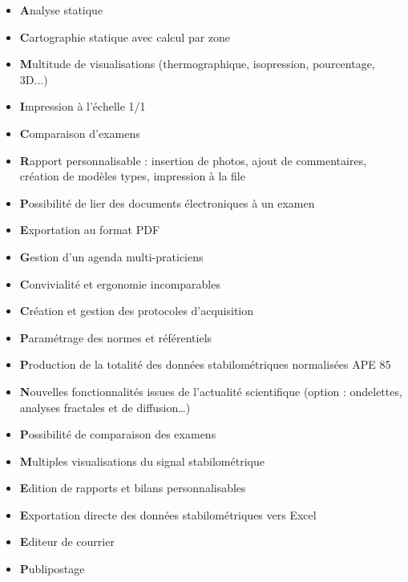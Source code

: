 \begin{itemize}

    \item \textbf Analyse statique 
    \item \textbf Cartographie statique avec calcul par zone 
    \item \textbf Multitude de visualisations (thermographique, isopression, pourcentage, 3D...)  
    \item \textbf Impression à l’échelle 1/1 
    \item \textbf Comparaison d’examens
    \item \textbf Rapport personnalisable : insertion de photos, ajout de commentaires, création de modèles types, impression à la file 
     \item \textbf Possibilité de lier des documents électroniques à un examen 
     \item \textbf Exportation au format PDF 
    \item \textbf Gestion d’un agenda multi-praticiens
    \item \textbf Convivialité et ergonomie incomparables 
    \item \textbf Création et gestion des protocoles d’acquisition 
    \item \textbf Paramétrage des normes et référentiels 
    \item \textbf Production de la totalité des données stabilométriques normalisées APE 85 
    \item \textbf Nouvelles fonctionnalités issues de l’actualité scientifique (option : ondelettes, analyses fractales et de diffusion…) 
    \item \textbf Possibilité de comparaison des examens 
    \item \textbf Multiples visualisations du signal stabilométrique 
    \item \textbf Edition de rapports et bilans personnalisables 
    \item \textbf Exportation directe des données stabilométriques vers Excel 
    \item \textbf Editeur de courrier 
    \item \textbf Publipostage
    
\end{itemize}

